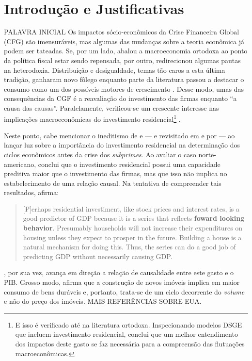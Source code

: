 \section{Introdução e Justificativas}\label{Intro}



PALAVRA INICIAL 
Os impactos sócio-econômicos da Crise Financeira Global (CFG) são imensuráveis, mas algumas das mudanças sobre a teoria econômica já podem ser tateadas. Se, por um lado, abalou a macroeconomia ortodoxa ao ponto da política fiscal estar sendo repensada, por outro, redirecionou algumas pautas na heterodoxia. Distribuição e desigualdade, temas tão caros a esta última tradição, ganharam novo fôlego enquanto parte da literatura passou a destacar o consumo como um dos possíveis motores de crescimento \cite{brochier_macroeconomics_2017}. Desse modo, umas das consequências da CGF é a reavaliação do investimento das firmas enquanto  ``a causa das causas''. Paralelamente, verificou-se um crescente interesse nas implicações macroeconômicas do investimento residencial\footnote{E isso é verificado até na literatura ortodoxa. Inspecionando modelos DSGE que incluem investimento residencial, \textcite{iacoviello_housing_2010} conclui que um melhor entendimento dos impactos deste gasto se faz necessária para a compreensão das flutuações macroeconômicas. } \cite{fiebiger_semi-autonomous_2018}. 

Neste ponto, cabe mencionar o ineditismo de \textcite{green_follow_1997} e \textcite{leamer_housing_2007} --- e revisitado em \textcite{leamer_housing_2015} e por \textcite{fiebiger_trend_2017} --- ao lançar luz sobre a importância do investimento residencial na determinação dos ciclos econômicos antes da crise dos \textit{subprimes}. Ao avaliar o caso norte-americano, \textcite{green_follow_1997} conclui que o investimento residencial possui uma capacidade preditiva maior que o investimento das firmas, mas que isso não implica no estabelecimento de uma relação causal. Na tentativa de compreender tais resultados, afirma:

\begin{quote}
	
	[P]erhaps residential investiment, like stock prices and interest rates, is a good predictor of GDP because it is a series that reflects \textbf{foward looking behavior}. Presumably households will not increase their expenditures on housing unless they expect to prosper in the future. Building a house is a natural mechanism for doing this. Thus, the series can do a good job of predicting GDP without necessarily causing GDP.
	\cite[p.~267, grifos adicionados]{green_follow_1997}
\end{quote}
\textcite{leamer_housing_2007}, por sua vez, avança em direção a relação de causalidade entre este gasto e o PIB. Grosso modo, afirma que a construção de novos imóveis implica em maior consumo de bens duráveis e, portanto, trata-se de um ciclo decorrente do \textit{volume} e não do preço dos imóveis. MAIS REFERÊNCIAS SOBRE EUA.

